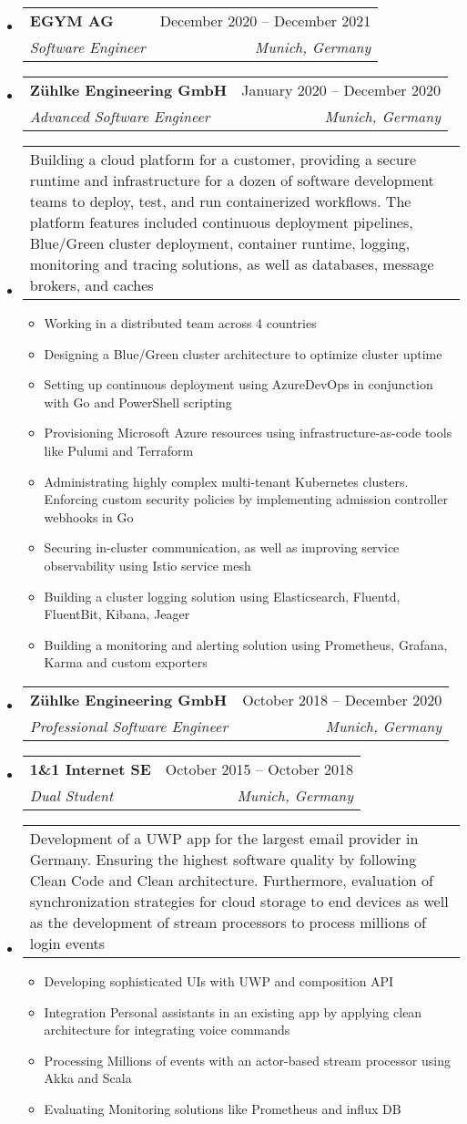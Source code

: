 \documentclass[letterpaper,12pt]{article}
\makeatletter
\newcommand{\resumeEntryStart}{\vspace{0.5\baselineskip}\begin{minipage}{\textwidth}\begin{itemize}[leftmargin=2.5mm]}
\newcommand{\resumeEntryEnd}{\end{itemize}\end{minipage}\vspace{1\baselineskip}}
\newcommand{\resumeItemListStart}{\begin{itemize}[leftmargin=4.5mm]}
\newcommand{\resumeItemListEnd}{\end{itemize}}
\newcommand{\resumeItem}[1]{
  \item\small{
    {#1 \vspace{-2pt}}
  }
}
\newcommand{\resumeEntryTSDL}[4]{
  \vspace{-1pt}\item[]
    \begin{tabularx}{0.97\textwidth}{X@{\hspace{60pt}}r}
      \textbf{\color{primary}#1} & {\color{accent}\small#2} \\
      \textit{\color{accent}\small#3} & \textit{\color{accent}\small#4} \\
    \end{tabularx}\vspace{-6pt}
}
\newcommand{\resumeEntryDesc}[1]{
  \vspace{-1pt}\item[] 
  \small{
    \begin{tabularx}{0.97\textwidth}{X}
      #1
    \end{tabularx}
  }
  \vspace{-6pt}
}
\makeatother
\begin{document}
  \resumeEntryStart
    \resumeEntryTSDL
      {EGYM AG}{December 2020 -- December 2021}
      {Software Engineer}{Munich, Germany}
  \resumeEntryEnd

  \resumeEntryStart
    \resumeEntryTSDL
      {Zühlke Engineering GmbH}{January 2020 -- December 2020}
      {Advanced Software Engineer}{Munich, Germany}
    \resumeEntryDesc{Building a cloud platform for a customer, providing a secure runtime and infrastructure for a dozen of software development teams to deploy, test, and run containerized workflows. The platform features included continuous deployment pipelines, Blue/Green cluster deployment, container runtime, logging, monitoring and tracing solutions, as well as databases, message brokers, and caches}
    \resumeItemListStart
        \resumeItem {Working in a distributed team across 4 countries}
        \resumeItem {Designing a Blue/Green cluster architecture to optimize cluster uptime}
        \resumeItem {Setting up continuous deployment using AzureDevOps in conjunction with Go and PowerShell scripting}
        \resumeItem {Provisioning Microsoft Azure resources using infrastructure-as-code tools like Pulumi and Terraform}
        \resumeItem {Administrating highly complex multi-tenant Kubernetes clusters. Enforcing custom security policies by implementing admission controller webhooks in Go}
        \resumeItem {Securing in-cluster communication, as well as improving service observability using Istio service mesh}
        \resumeItem {Building a cluster logging solution using Elasticsearch, Fluentd, FluentBit, Kibana, Jeager}
        \resumeItem {Building a monitoring and alerting solution using Prometheus, Grafana, Karma and custom exporters}
    \resumeItemListEnd
  \resumeEntryEnd

  \resumeEntryStart
    \resumeEntryTSDL
      {Zühlke Engineering GmbH}{October 2018 -- December 2020}
      {Professional Software Engineer}{Munich, Germany}
  \resumeEntryEnd

  \resumeEntryStart
    \resumeEntryTSDL
    {1\&1 Internet SE}{October 2015 -- October 2018}
    {Dual Student}{Munich, Germany}
    \resumeEntryDesc{Development of a UWP app for the largest email provider in Germany. Ensuring the highest software quality by following Clean Code and Clean architecture. Furthermore, evaluation of synchronization strategies for cloud storage to end devices as well as the development of stream processors to process millions of login events}
    \resumeItemListStart
      \resumeItem {Developing sophisticated UIs with UWP and composition API}
      \resumeItem {Integration Personal assistants in an existing app by applying clean architecture for integrating voice commands}
      \resumeItem {Processing Millions of events with an actor-based stream processor using Akka and Scala}
      \resumeItem {Evaluating Monitoring solutions like Prometheus and influx DB}
    \resumeItemListEnd
  \resumeEntryEnd
\end{document}
